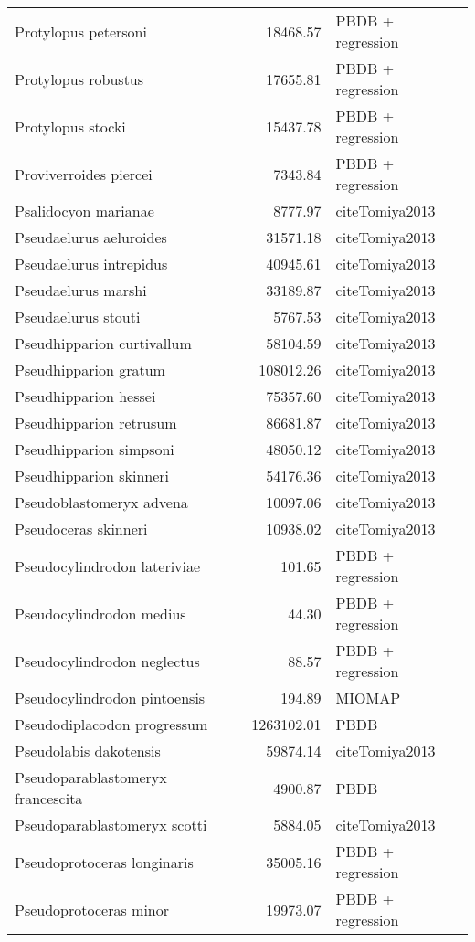 \begin{table}[ht]
\begin{tabular}{lrl}
  Protylopus petersoni & 18468.57 & PBDB + regression \\ 
  Protylopus robustus & 17655.81 & PBDB + regression \\ 
  Protylopus stocki & 15437.78 & PBDB + regression \\ 
  Proviverroides piercei & 7343.84 & PBDB + regression \\ 
  Psalidocyon marianae & 8777.97 & cite{Tomiya2013} \\ 
  Pseudaelurus aeluroides & 31571.18 & cite{Tomiya2013} \\ 
  Pseudaelurus intrepidus & 40945.61 & cite{Tomiya2013} \\ 
  Pseudaelurus marshi & 33189.87 & cite{Tomiya2013} \\ 
  Pseudaelurus stouti & 5767.53 & cite{Tomiya2013} \\ 
  Pseudhipparion curtivallum & 58104.59 & cite{Tomiya2013} \\ 
  Pseudhipparion gratum & 108012.26 & cite{Tomiya2013} \\ 
  Pseudhipparion hessei & 75357.60 & cite{Tomiya2013} \\ 
  Pseudhipparion retrusum & 86681.87 & cite{Tomiya2013} \\ 
  Pseudhipparion simpsoni & 48050.12 & cite{Tomiya2013} \\ 
  Pseudhipparion skinneri & 54176.36 & cite{Tomiya2013} \\ 
  Pseudoblastomeryx advena & 10097.06 & cite{Tomiya2013} \\ 
  Pseudoceras skinneri & 10938.02 & cite{Tomiya2013} \\ 
  Pseudocylindrodon lateriviae & 101.65 & PBDB + regression \\ 
  Pseudocylindrodon medius & 44.30 & PBDB + regression \\ 
  Pseudocylindrodon neglectus & 88.57 & PBDB + regression \\ 
  Pseudocylindrodon pintoensis & 194.89 & MIOMAP \\ 
  Pseudodiplacodon progressum & 1263102.01 & PBDB \\ 
  Pseudolabis dakotensis & 59874.14 & cite{Tomiya2013} \\ 
  Pseudoparablastomeryx francescita & 4900.87 & PBDB \\ 
  Pseudoparablastomeryx scotti & 5884.05 & cite{Tomiya2013} \\ 
  Pseudoprotoceras longinaris & 35005.16 & PBDB + regression \\ 
  Pseudoprotoceras minor & 19973.07 & PBDB + regression \\ 

\end{tabular}
\end{table}
